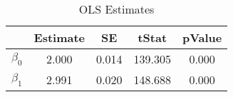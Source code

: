 \begin{table}[htb]
\centering
\caption{OLS Estimates}
\label{table:ea3:ps1:q3b:tab1}
\begin{tabular}{lcccc}
\hline
 & Estimate & SE & tStat & pValue \\
\hline\hline
$\beta_0$ & 2.000 & 0.014 & 139.305 & 0.000 \\
$\beta_1$ & 2.991 & 0.020 & 148.688 & 0.000 \\
\hline
\end{tabular}
\end{table}
